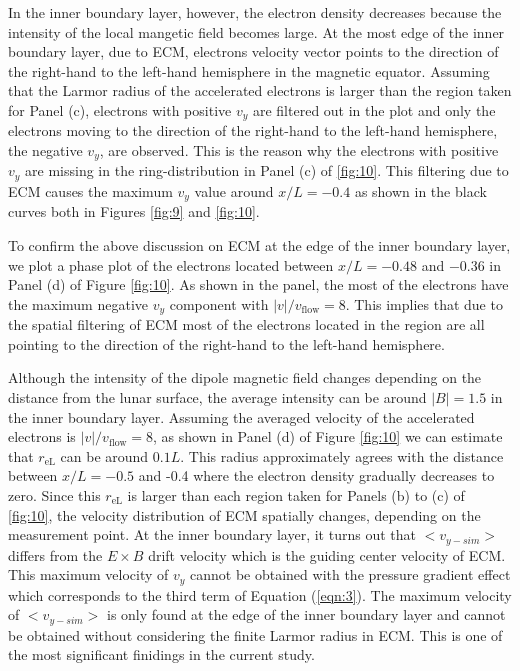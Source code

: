 \documentclass[draft,jgrga]{agutex2015}
\begin{document}
\begin{article}
In the inner boundary layer, however, 
the electron density decreases because the intensity of the
local mangetic field becomes large.
At the most edge of the inner boundary layer,
due to ECM, electrons velocity vector points to the direction
of the right-hand to the left-hand hemisphere in the magnetic equator.
Assuming that the Larmor radius of the accelerated electrons
is larger than the region taken for Panel (c), 
electrons with positive $v_y$ are filtered out in the plot
and only the electrons moving to the direction
of the right-hand to the left-hand hemisphere, 
the negative $v_y$, are observed. 
This is the reason why the electrons with positive $v_y$ 
are missing in the ring-distribution in Panel (c) of \ref{fig:10}.
This filtering due to ECM causes the maximum $v_y$ value around $x/L = -0.4$ as
shown in the black curves both in Figures \ref{fig:9} and \ref{fig:10}. 

To confirm the above discussion on ECM 
at the edge of the inner boundary layer,
we plot a phase plot of the electrons located between 
$x/L = -0.48$ and $-0.36$ in Panel (d) of Figure \ref{fig:10}.
As shown in the panel, 
the most of the electrons have the maximum negative $v_y$ component 
with $|v|/v_\mathrm{flow}=8$. 
This implies that due to the spatial filtering of ECM 
most of the electrons located in the region 
are all pointing to the direction
of the right-hand to the left-hand hemisphere. 

Although the intensity of the dipole magnetic field changes depending on 
the distance from the lunar surface, 
the average intensity can be around $|B|=1.5$ in the inner boundary layer.
Assuming the averaged velocity of the accelerated electrons is 
$|v|/v_\mathrm{flow}=8$, as shown in Panel (d) of Figure \ref{fig:10} 
we can estimate that $r_\mathrm{eL}$ can be around $0.1L$.
This radius approximately agrees with the distance 
between $x/L = -0.5$ and -0.4 where
the electron density gradually decreases to zero.
Since this $r_\mathrm{eL}$ is larger than each region 
taken for Panels (b) to (c) of \ref{fig:10}, 
the velocity distribution of ECM spatially changes,
depending on the measurement point.
At the inner boundary layer,
it turns out that $<v_{y-sim}>$ differs from the $E \times B$ drift velocity
which is the guiding center velocity of ECM.
This maximum velocity of $v_y$ cannot be obtained with 
the pressure gradient effect which corresponds
to the third term of Equation (\ref{eqn:3}). 
The maximum velocity of $<v_{y-sim}>$ is only found at the edge of the
inner boundary layer and cannot be obtained without considering
the finite Larmor radius in ECM. 
This is one of the most significant finidings in the current study.


\end{article}
\end{document}
